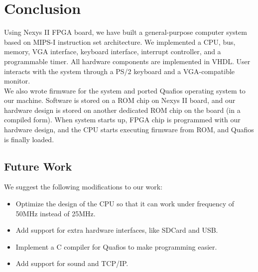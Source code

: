 \documentclass[oneside]{book}
\begin{document}

\chapter{Conclusion}

Using Nexys II FPGA board, we have built a general-purpose computer system
based on MIPS-I instruction set architecture. We implemented a CPU, bus, memory,
VGA interface, keyboard interface, interrupt controller, and a programmable
timer. All hardware components are implemented in VHDL. User interacts
with the system through a PS/2 keyboard and a VGA-compatible monitor. \\

We also wrote firmware for the system and ported Quafios operating system
to our machine. Software is stored on a ROM chip on Nexys II board,
and our hardware design is stored on another dedicated ROM chip on
the board (in a compiled form). When system starts up, FPGA chip
is programmed with our hardware design, and the CPU starts executing
firmware from ROM, and Quafios is finally loaded.

\section{Future Work}

We suggest the following modifications to our work:

\begin{itemize}

\item Optimize the design of the CPU so that it can work under frequency
      of 50MHz instead of 25MHz.

\item Add support for extra hardware interfaces, like SDCard and USB.

\item Implement a C compiler for Quafios to make programming easier.

\item Add support for sound and TCP/IP.

\end{itemize}

\end{document}
